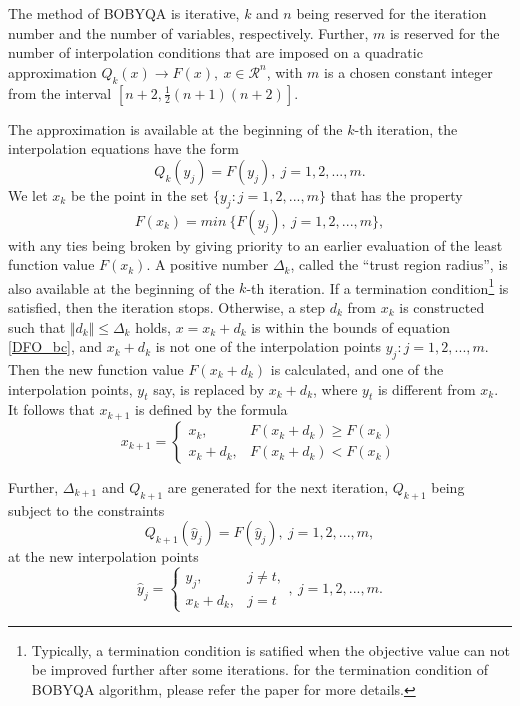 \documentclass  [
  paper    = a4,
  BCOR     = 10mm,
  twoside,
  fontsize = 12pt,
  fleqn,
  toc      = bibnumbered,
  toc      = listofnumbered,
  numbers  = noendperiod,
  headings = normal,
  listof   = leveldown,
  version  = 3.03
]                                       {scrreprt}
\newcommand{\<}{\langle}
\renewcommand{\>}{\rangle}
\begin{document}
   The method of BOBYQA is iterative, $k$ and $n$ being reserved for the iteration number and the number of variables, respectively. Further, $m$ is reserved for the number of interpolation conditions that are imposed on a quadratic approximation $Q_k(x) \xrightarrow{} F(x), \ x \in  \mathcal{R}^n$, with $m$ is a chosen constant  integer from the interval $[n+2, \frac{1}{2}(n+1)(n+2)]$. 
   
   The approximation is available at the beginning of the $k$-th iteration, the interpolation equations have the form
   \begin{equation}
   Q_k(y_j)= F(y_j),\   j = 1, 2, ..., m.
   \end{equation}
   We let $x_k$ be the point in the set $\{y_j : j = 1, 2, ... , m\}$ that has the property
   \begin{equation}
   F(x_k)= min\ \{F(y_j), \  j = 1, 2, ..., m\}, 
   \end{equation}
   with any ties being broken by giving priority to an earlier evaluation of the least function value $F(x_k)$. A positive number $\Delta_k$, called the “trust region radius”, is also available at the beginning of the $k$-th iteration. If a termination condition\footnote{Typically, a termination condition is satified when the objective value can not be improved further after some iterations. for the termination condition of BOBYQA algorithm, please refer the paper \cite{MicPow09} for more details.} is satisfied, then the iteration stops. Otherwise, a step $d_k$ from $x_k$ is constructed such that $ \Vert d_k \Vert \leq \Delta_k $ holds, $x = x_k+d_k$ is within the bounds of equation \ref{DFO_bc}, and $x_k+d_k$ is not one of the interpolation points $y_j : j = 1, 2, ... , m$. Then the new function value $F(x_k+d_k)$ is calculated, and one of the interpolation points, $y_t$ say, is replaced by $x_k+d_k$, where $y_t$ is different from $x_k$. It follows that $x_{k+1}$ is defined by the formula
   \begin{equation}
   x_{k+1} =
   \begin{cases}
   x_k, & F(x_k+d_k) \geq F(x_k) \\
   x_k+d_k  , & F(x_k+d_k) < F(x_k) 
   \end{cases}
   \end{equation}
   
   Further, $\Delta_{k+1}$ and $Q_{k+1}$ are generated for the next iteration, $Q_{k+1}$ being subject to the constraints 
   \begin{equation}
   Q_{k+1}(\hat{y}_j)= F(\hat{y}_j), \  j = 1, 2, ..., m, 
   \end{equation}
   at the new interpolation points
   \begin{equation}
   \hat{y}_j =
   \begin{cases}
   y_j, & j \neq t, \\
   x_k+d_k  , & j =t 
   \end{cases},  \  j = 1, 2, ..., m.
   \end{equation}
   
\end{document}
